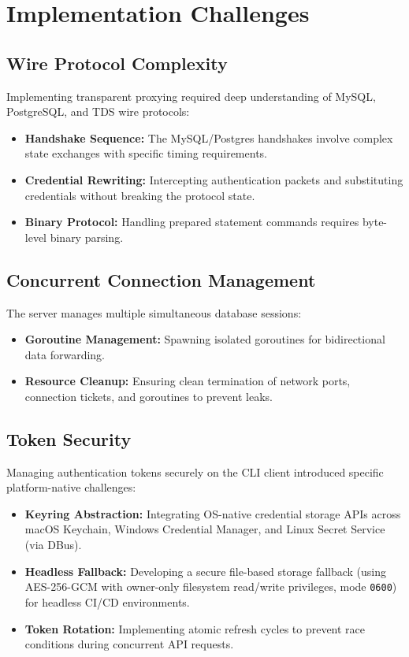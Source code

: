 \section{Implementation Challenges}

\subsection{Wire Protocol Complexity}

Implementing transparent proxying required deep understanding of MySQL, PostgreSQL, and TDS wire protocols:
\begin{itemize}
    \item \textbf{Handshake Sequence:} The MySQL/Postgres handshakes involve complex state exchanges with specific timing requirements.
    \item \textbf{Credential Rewriting:} Intercepting authentication packets and substituting credentials without breaking the protocol state.
    \item \textbf{Binary Protocol:} Handling prepared statement commands requires byte-level binary parsing.
\end{itemize}

\subsection{Concurrent Connection Management}

The server manages multiple simultaneous database sessions:
\begin{itemize}
    \item \textbf{Goroutine Management:} Spawning isolated goroutines for bidirectional data forwarding.
    \item \textbf{Resource Cleanup:} Ensuring clean termination of network ports, connection tickets, and goroutines to prevent leaks.
\end{itemize}

\subsection{Token Security}

Managing authentication tokens securely on the CLI client introduced specific platform-native challenges:
\begin{itemize}
    \item \textbf{Keyring Abstraction:} Integrating OS-native credential storage APIs across macOS Keychain, Windows Credential Manager, and Linux Secret Service (via DBus).
    \item \textbf{Headless Fallback:} Developing a secure file-based storage fallback (using AES-256-GCM with owner-only filesystem read/write privileges, mode \texttt{0600}) for headless CI/CD environments.
    \item \textbf{Token Rotation:} Implementing atomic refresh cycles to prevent race conditions during concurrent API requests.
\end{itemize}

